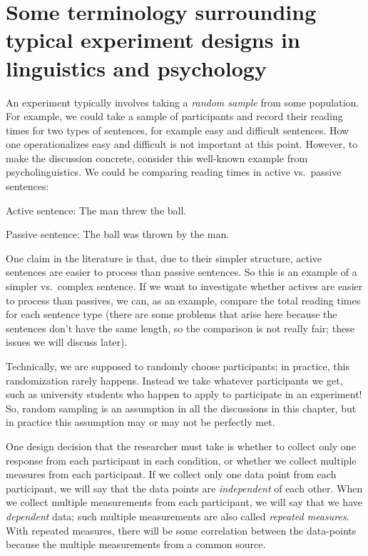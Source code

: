 \documentclass[12pt,]{krantz}
\begin{document}
\hypertarget{some-terminology-surrounding-typical-experiment-designs-in-linguistics-and-psychology}{%
\section{Some terminology surrounding typical experiment designs in linguistics and psychology}\label{some-terminology-surrounding-typical-experiment-designs-in-linguistics-and-psychology}}

An experiment typically involves taking a \emph{random sample} from some population. For example, we could take a sample of participants and record their reading times for two types of sentences, for example easy and difficult sentences. How one operationalizes easy and difficult is not important at this point. However, to make the discussion concrete, consider this well-known example from psycholinguistics. We could be comparing reading times in active vs.~passive sentences:

Active sentence: The man threw the ball.

Passive sentence: The ball was thrown by the man.

One claim in the literature is that, due to their simpler structure, active sentences are easier to process than passive sentences. So this is an example of a simpler vs.~complex sentence. If we want to investigate whether actives are easier to process than passives, we can, as an example, compare the total reading times for each sentence type (there are some problems that arise here because the sentences don't have the same length, so the comparison is not really fair; these issues we will discuss later).

Technically, we are supposed to randomly choose participants; in practice, this randomization rarely happens. Instead we take whatever participants we get, such as university students who happen to apply to participate in an experiment! So, random sampling is an assumption in all the discussions in this chapter, but in practice this assumption may or may not be perfectly met.

One design decision that the researcher must take is whether to collect only one response from each participant in each condition, or whether we collect multiple measures from each participant. If we collect only one data point from each participant, we will say that the data points are \emph{independent} of each other. When we collect multiple measurements from each participant, we will say that we have \emph{dependent} data; such multiple measurements are also called \emph{repeated measures}. With repeated measures, there will be some correlation between the data-points because the multiple measurements from a common source.
\end{document}
